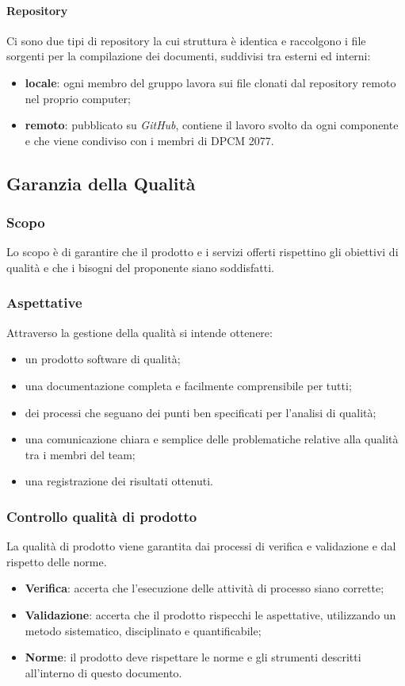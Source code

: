 			\paragraph{Repository}
			Ci sono due tipi di repository la cui struttura è identica e raccolgono i file sorgenti per la compilazione dei documenti, suddivisi tra esterni ed interni:
			\begin{itemize}
		   			\item \textbf{locale}: ogni membro del gruppo lavora sui file clonati dal repository remoto nel proprio computer;
		   			\item \textbf{remoto}: pubblicato su \textit{GitHub}, contiene il lavoro svolto da ogni componente e che viene condiviso con i membri di DPCM 2077.
		   	\end{itemize}
		   	
	\subsection{Garanzia della Qualità}
		\subsubsection{Scopo}
		Lo scopo è di garantire che il prodotto e i servizi offerti rispettino gli obiettivi di qualità e che i bisogni del proponente siano soddisfatti.
		\subsubsection{Aspettative}
		Attraverso la gestione della qualità si intende ottenere:
		\begin{itemize}
			\item un prodotto software di qualità;
			\item una documentazione completa e facilmente comprensibile per tutti;
			\item dei processi che seguano dei punti ben specificati per l'analisi di qualità;
			\item una comunicazione chiara e semplice delle problematiche relative alla qualità tra i membri del team;
			\item una registrazione dei risultati ottenuti.
		\end{itemize}
		\subsubsection{Controllo qualità di prodotto}
		La qualità di prodotto viene garantita dai processi di verifica e validazione e dal rispetto delle norme.
		\begin{itemize}
			\item \textbf{Verifica}: accerta che l’esecuzione delle attività di processo siano corrette;
			\item \textbf{Validazione}: accerta che il prodotto rispecchi le aspettative, utilizzando un metodo sistematico, disciplinato e quantificabile;
			\item \textbf{Norme}:   il  prodotto  deve  rispettare  le  norme  e  gli  strumenti  descritti  all’interno  di  questo documento.
		\end{itemize}

